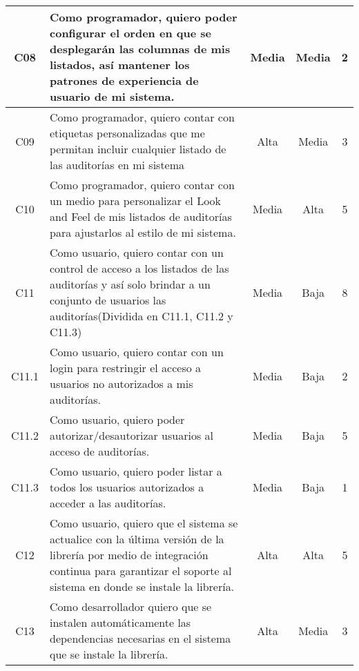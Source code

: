 \begin{longtable}{| c | p{8cm} | c |c | c |}
C08    & Como programador, quiero poder configurar el orden en que se desplegarán las columnas de mis listados, así mantener los patrones de experiencia de usuario de mi sistema.                          & Media     & Media  & 2            \\ \hline
C09    & Como programador, quiero contar con etiquetas personalizadas que me permitan incluir cualquier listado de las auditorías en mi sistema                                                             & Alta      & Media  & 3            \\ \hline
C10    & Como programador, quiero contar con un medio para personalizar el Look and Feel de mis listados de auditorías para ajustarlos al estilo de mi sistema.                                             & Media     & Alta   & 5            \\ \hline
C11    & Como usuario, quiero contar con un control de acceso a los listados de las auditorías y así solo brindar a un conjunto de usuarios las auditorías(Dividida en C11.1, C11.2 y C11.3)                & Media     & Baja   & 8            \\ \hline
C11.1  & Como usuario, quiero contar con un login para restringir el acceso a usuarios no autorizados a mis auditorías.                                                                                     & Media     & Baja   & 2            \\ \hline
C11.2  & Como usuario, quiero poder autorizar/desautorizar usuarios al acceso de auditorías.                                                                                                                & Media     & Baja   & 5            \\ \hline
C11.3  & Como usuario, quiero poder listar a todos los usuarios autorizados a acceder a las auditorías.                                                                                                     & Media     & Baja   & 1            \\ \hline
C12    & Como usuario, quiero que el sistema se actualice con la última versión de la librería por medio de integración continua para garantizar el soporte al sistema en donde se instale la librería.     & Alta      & Alta   & 5            \\ \hline
C13    & Como desarrollador quiero que se instalen automáticamente las dependencias necesarias en el sistema que se instale la librería.                                                                    & Alta      & Media  & 3            \\ \hline
\end{longtable}


